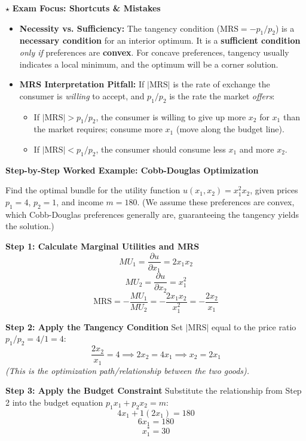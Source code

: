 \documentclass{article}
\begin{document}
$\star$ \textbf{Exam Focus: Shortcuts \& Mistakes}
\begin{itemize}
    \item \textbf{Necessity vs. Sufficiency:} The tangency condition ($\text{MRS} = -p_1/p_2$) is a \textbf{necessary condition} for an interior optimum. It is a \textbf{sufficient condition} \textit{only if} preferences are \textbf{convex}. For concave preferences, tangency usually indicates a local minimum, and the optimum will be a corner solution.

    \item \textbf{MRS Interpretation Pitfall:} If $|\text{MRS}|$ is the rate of exchange the consumer is \textit{willing} to accept, and $p_1/p_2$ is the rate the market \textit{offers}:
    \begin{itemize}
        \item If $|\text{MRS}| > p_1/p_2$, the consumer is willing to give up more $x_2$ for $x_1$ than the market requires; consume more $x_1$ (move along the budget line).
        \item If $|\text{MRS}| < p_1/p_2$, the consumer should consume less $x_1$ and more $x_2$.
    \end{itemize}
\end{itemize}

\vspace{0.5em}
\hrulefill
\vspace{0.5em}

\noindent\textbf{Step-by-Step Worked Example: Cobb-Douglas Optimization}

Find the optimal bundle for the utility function $u(x_1, x_2) = x_1^2 x_2$, given prices $p_1=4$, $p_2=1$, and income $m=180$. (We assume these preferences are convex, which Cobb-Douglas preferences generally are, guaranteeing the tangency yields the solution.)

\textbf{Step 1: Calculate Marginal Utilities and MRS}
\[ MU_1 = \frac{\partial u}{\partial x_1} = 2x_1 x_2 \]
\[ MU_2 = \frac{\partial u}{\partial x_2} = x_1^2 \]
\[ \text{MRS} = -\frac{MU_1}{MU_2} = -\frac{2x_1 x_2}{x_1^2} = -\frac{2x_2}{x_1} \]

\textbf{Step 2: Apply the Tangency Condition}
Set $|\text{MRS}|$ equal to the price ratio $p_1/p_2 = 4/1 = 4$:
\[ \frac{2x_2}{x_1} = 4 \implies 2x_2 = 4x_1 \implies x_2 = 2x_1 \]
\textit{(This is the optimization path/relationship between the two goods).}

\textbf{Step 3: Apply the Budget Constraint}
Substitute the relationship from Step 2 into the budget equation $p_1 x_1 + p_2 x_2 = m$:
\[ 4x_1 + 1(2x_1) = 180 \]
\[ 6x_1 = 180 \]
\[ x_1^* = 30 \]
\end{document}
